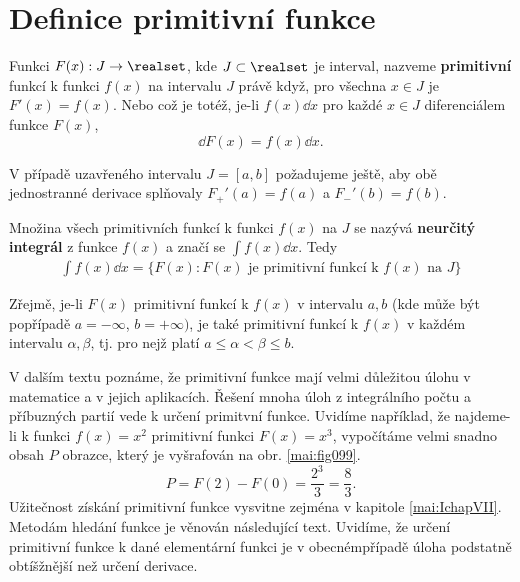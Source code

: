   \section{Definice primitivní funkce}\label{mai:IchapVIIsecI}  
    \begin{mdframed}[style=mdmathdef] 
      \begin{definition}\label{mai:def002}
        Funkci \(F(x): J\rightarrow \realset\), kde \(J\subset \realset\) je interval, nazveme
        \textbf{primitivní} funkcí k funkci \(f(x)\) na intervalu \(J\) právě když, pro všechna
        \(x\in J\) je \(F'(x) = f(x)\). Nebo což je totéž, je-li \(f(x)\dd{x}\) pro každé \(x\in J\)
        diferenciálem funkce \(F(x)\),
        \begin{equation*}
          \dd{F}(x) = f(x)\dd{x}.
        \end{equation*}
        
        V případě uzavřeného intervalu \(J=[a,b]\) požadujeme ještě, aby obě jednostranné derivace
        splňovaly \(F_+'(a)=f(a)\) a \(F_-'(b)=f(b)\). 
        
        Množina všech primitivních funkcí k funkci \(f(x)\) na \(J\) se nazývá \textbf{neurčitý
        integrál} z funkce \(f(x)\) a značí se \(\int f(x)\dd{x}\). Tedy
        \begin{gather*}
          \int f(x)\dd{x} = \{F(x): \text{\(F(x)\) je primitivní funkcí k \(f(x)\) na \(J\)}\}
        \end{gather*}
      \end{definition}
    \end{mdframed}

    Zřejmě, je-li \(F(x)\) primitivní funkcí k \(f(x)\) v intervalu \(a,b\) (kde může být popřípadě
    \(a=-\infty\), \(b=+\infty)\), je také primitivní funkcí k \(f(x)\) v každém intervalu \(\alpha,
    \beta\), tj. pro nejž platí \(a\leq\alpha<\beta\leq b\). 

    V dalším textu poznáme, že primitivní funkce mají velmi důležitou úlohu v matematice a v jejich
    aplikacích. Řešení mnoha úloh z integrálního počtu a příbuzných partií vede k určení primitvní
    funkce. Uvidíme například, že najdeme-li k funkci \(f(x)= x^2\) primitivní funkci \(F(x) =
    x^3\), vypočítáme velmi snadno obsah \(P\) obrazce, který je vyšrafován na obr.
    \ref{mai:fig099}.
    \begin{equation*}
      P = F(2) - F(0) = \frac{2^3}{3} = \frac{8}{3}.
    \end{equation*}
    Užitečnost získání primitivní funkce vysvitne zejména v kapitole \ref{mai:IchapVII}. Metodám
    hledání funkce je věnován následující text. Uvidíme, že určení primitivní funkce k dané
    elementární funkci je v obecnémpřípadě úloha podstatně obtíšžnější než určení derivace.  
    
